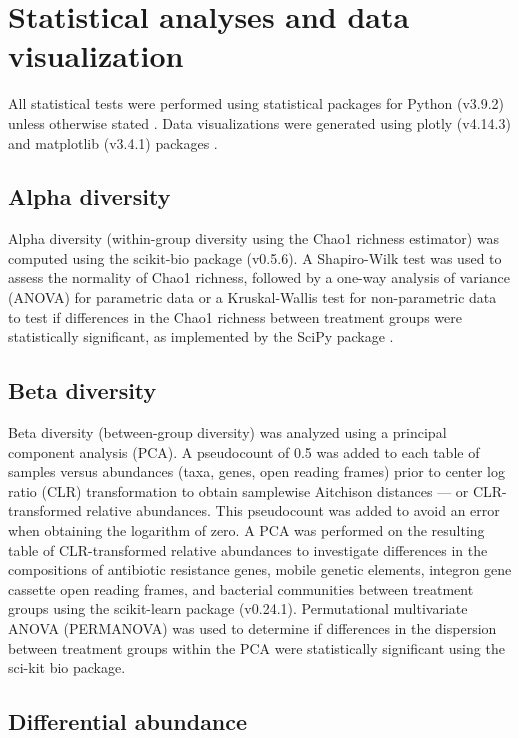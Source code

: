 \section{Statistical analyses and data visualization}

All statistical tests were performed using statistical packages for Python (v3.9.2) unless otherwise stated \parencite{vanRossum.2009}.
Data visualizations were generated using plotly (v4.14.3) and matplotlib (v3.4.1) packages \parencite{PlotlyTechnologiesInc..2015, Hunter.2007}.

\subsection{Alpha diversity}

Alpha diversity (within-group diversity using the Chao1 richness estimator) was computed using the scikit-bio package (v0.5.6).
A Shapiro-Wilk test was used to assess the normality of Chao1 richness, followed by a one-way analysis of variance (ANOVA) for parametric data or a Kruskal-Wallis test for non-parametric data to test if differences in the Chao1 richness between treatment groups were statistically significant, as implemented by the SciPy package \parencite{Virtanen.2020}.

\subsection{Beta diversity}

Beta diversity (between-group diversity) was analyzed using a principal component analysis (PCA).
A pseudocount of 0.5 was added to each table of samples versus abundances (taxa, genes, open reading frames) prior to center log ratio (CLR) transformation to obtain samplewise Aitchison distances --- or CLR-transformed relative abundances.
This pseudocount was added to avoid an error when obtaining the logarithm of zero.
A PCA was performed on the resulting table of CLR-transformed relative abundances to investigate differences in the compositions of antibiotic resistance genes, mobile genetic elements, integron gene cassette open reading frames, and bacterial communities between treatment groups using the scikit-learn package (v0.24.1).
Permutational multivariate ANOVA (PERMANOVA) was used to determine if differences in the dispersion between treatment groups within the PCA were statistically significant using the sci-kit bio package.

\subsection{Differential abundance}


